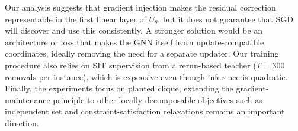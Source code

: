 \documentclass[journal,article,submit,pdftex,moreauthors]{Definitions/mdpi}
\begin{document}
Our analysis suggests that gradient injection makes the residual correction
representable in the first linear layer of $U_\theta$, but it does not guarantee
that SGD will discover and use this consistently. A stronger solution would be an
architecture or loss that makes the GNN itself learn update-compatible coordinates,
ideally removing the need for a separate updater. Our training procedure also relies
on SIT supervision from a rerun-based teacher ($T=300$ removals per instance), which
is expensive even though inference is quadratic. Finally, the experiments focus on
planted clique; extending the gradient-maintenance principle to other locally
decomposable objectives such as independent set and constraint-satisfaction
relaxations remains an important direction.








\end{document}
